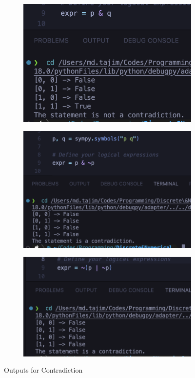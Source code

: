 \begin{figure}[h]
    \begin{subfigure}{.5\textwidth}
        \centering
        \includegraphics[width=.8\linewidth]{images/output/7pANDq.png}
        \caption*{}
        \label{fig:sfig1}
    \end{subfigure}
    \begin{subfigure}{.5\textwidth}
        \centering
        \includegraphics[width=.8\linewidth]{images/output/8pAND~p.png}
        \caption*{}
        \label{fig:sfig2}
    \end{subfigure}
    \begin{subfigure}{1\textwidth}
        \centering
        \includegraphics[width=.5\linewidth]{images/output/9~pOR~P.png}
        \caption*{}
        \label{fig:sfig3}
    \end{subfigure}
    \caption{Outputs for Contradiction}
    \label{fig:fig}
\end{figure}

